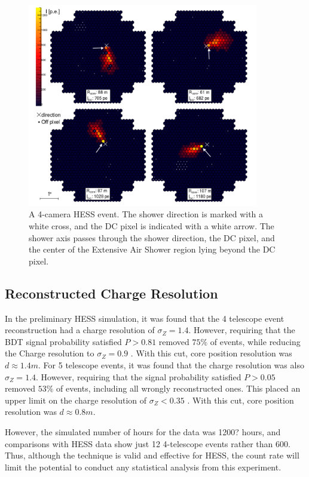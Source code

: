 \documentclass{article}
\begin{document}
\begin{figure}
\begin{center}
\includegraphics[width=0.9\textwidth]{hess}
\caption{A 4-camera HESS event. The shower direction is marked with a white cross, and the DC pixel is indicated with a white arrow. The shower axis passes through the shower direction, the DC pixel, and the center of the Extensive Air Shower region lying beyond the DC pixel.}
\label{fig:hess}
\end{center}
\end{figure}

\subsection{Reconstructed Charge Resolution}
In the preliminary HESS simulation, it was found that the 4 telescope event reconstruction had a charge resolution of $\sigma_{Z} = 1.4$. However, requiring that the BDT signal probability satisfied $P > 0.81$ removed $75 \%$ of events, while reducing the Charge resolution to $\sigma_{Z} = 0.9$ . With this cut, core position resolution was $d \approx 1.4 m $. For 5 telescope events, it was found that the charge resolution was also $\sigma_{Z} = 1.4$. However, requiring that the signal probability satisfied $P > 0.05$ removed $53 \%$ of events, including all wrongly reconstructed ones. This placed an upper limit on the charge resolution of $\sigma_{Z} < 0.35$ . With this cut, core position resolution was $d \approx 0.8 m $.

However, the simulated number of hours for the data was 1200? hours, and comparisons with HESS data show just 12 4-telescope events rather than 600. Thus, although the technique is valid and effective for HESS, the count rate will limit the potential to conduct any statistical analysis from this experiment.
\end{document}
